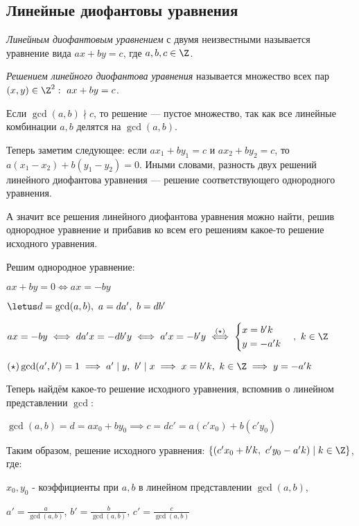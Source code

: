 \subsection{Линейные диофантовы уравнения}

\begin{defn}
    \emph{Линейным диофантовым уравнением} с двумя неизвестными называется уравнение вида $ax + by = c$, где $a, b, c \in \Z$.
\end{defn}

\begin{defn}
    \emph{Решением линейного диофантова уравнения} называется множество всех пар $(x, y) \in \Z^2:\ ax + by = c$.
\end{defn}

\begin{notice}
    Если $\gcd(a, b) \nmid c$, то решение --- пустое множество, так как все линейные комбинации $a, b$ делятся на $\gcd(a, b)$.
\end{notice}

\begin{notice}
    Теперь заметим следующее: если $ax_1 + by_1 = c$ и $ax_2 + by_2 = c$, то $a(x_1 - x_2) + b(y_1 - y_2) = 0$.
    Иными словами, разность двух решений линейного диофантова уравнения --- решение соответствующего однородного уравнения.
\end{notice}

А значит все решения линейного диофантова уравнения можно найти, решив однородное уравнение и прибавив ко всем его решениям какое-то решение исходного уравнения.

Решим однородное уравнение:

$ax + by = 0 \iff ax = -by$

$\letus d = \gcd(a, b),~ a = da',~ b = db'$

$ax = -by \iff da'x = -db'y \iff a'x = -b'y \overset{(\star)}{\iff}
\begin{cases}
    x = b'k \\
    y = -a'k
\end{cases},\ k \in \Z$

$(\star) \gcd(a', b') = 1 \implies a' \mid y,~ b' \mid x \implies x = b'k,~ k\in \Z \implies y = -a'k$

Теперь найдём какое-то решение исходного уравнения, вспомнив о линейном представлении $\gcd$:

$\gcd(a, b) = d = ax_0 + by_0 \implies c = dc' = a(c'x_0) + b(c'y_0)$

Таким образом, решение исходного уравнения: $\{(c'x_0 + b'k,~ c'y_0 -a'k) \mid k \in \Z\}$, где:

$x_0, y_0$ - коэффициенты при $a, b$ в линейном представлении $\gcd(a, b)$,

$a' = \frac{a}{\gcd(a, b)}$, $b' = \frac{b}{\gcd(a, b)}$, $c' = \frac{c}{\gcd(a, b)}$


